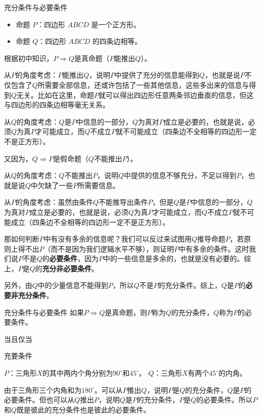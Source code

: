 \begin{example}{充分条件与必要条件}

\begin{itemize}
\item 命题 $P$：四边形 $ABCD$ 是一个正方形。
\item 命题 $Q$：四边形 $ABCD$ 的四条边相等。
\end{itemize}

根据初中知识，$P\Rightarrow Q$是真命题（$P$能推出$Q$）。

从$P$的角度考虑：$P$能推出$Q$，说明$P$中提供了充分的信息能得到$Q$，也就是说$P$不仅包含了$Q$所需要全部信息，还或许包括了一些其他信息，这些多出来的信息与得到$Q$无关。比如在这里，命题$P$就可以得出四边形任意两条邻边垂直的信息，但这与四边形的四条边相等毫无关系。

从$Q$的角度考虑：$Q$是$P$中信息的一部分，$Q$为真对$P$成立是必要的，也就是说，必须$Q$为真$P$才可能成立，而$Q$不成立$P$就不可能成立（四条边不全相等的四边形一定不是正方形）。

又因为，$Q\Rightarrow P$是假命题（$Q$不能推出$P$）。

从$Q$的角度考虑：$Q$不能推出$P$，说明$Q$中提供的信息不够充分，不足以得到$P$，也就是说$Q$中欠缺了一些$P$所需要信息。

从$P$的角度考虑：虽然由条件$Q$不能推导出条件$P$，但是$Q$是$P$中信息的一部分，$Q$为真对$P$成立是必要的，也就是说，必须$Q$为真$P$才可能成立，而$Q$不成立$P$就不可能成立（四条边不全相等的四边形一定不是正方形）。
\end{example}

那如何判断$P$中有没有多余的信息呢？我们可以反过来试图用$Q$推导命题$P$，若原则上得不出$P$（而不是因为我们逻辑水平不够），则证明$P$中有多余的条件。这时我们说$P$不是$Q$的\textbf{必要条件}，因为$P$中的一些信息是多余的，也就是没有必要的。综上，$P$是$Q$的\textbf{充分非必要条件}。

另外，由$Q$中的少量信息不能得到$P$，所以$Q$不是$P$的充分条件。综上，$Q$是$P$的\textbf{必要非充分条件}。

\begin{definition}{充分条件与必要条件}
如果$P\Rightarrow Q$是真命题，则$P$称为$Q$的充分条件，$Q$称为$P$的必要条件。
\end{definition}

当且仅当




\begin{example}{充要条件}
\begin{itemize}
$P$：三角形$X$的其中两内个角分别为$90^\circ$和$45^\circ$。
$Q$：三角形$X$有两个$45^\circ$的内角。
\end{itemize}

由于三角形三个内角和为$180^\circ$。可以从$P$推出$Q$，说明$P$是$Q$的充分条件，$Q$是$P$的必要条件。但也可以从$Q$推出$P$，说明$Q$是$P$的充分条件，$P$是$Q$的必要条件。所以$P$和$Q$既是彼此的充分条件也是彼此的必要条件。
\end{example}

